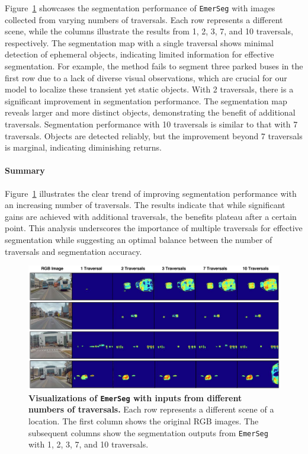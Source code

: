 Figure~\ref{fig:ablation-traversal-appendix} showcases the segmentation performance of \texttt{EmerSeg} with images collected from varying numbers of traversals. Each row represents a different scene, while the columns illustrate the results from 1, 2, 3, 7, and 10 traversals, respectively. The segmentation map with a single traversal shows minimal detection of ephemeral objects, indicating limited information for effective segmentation. For example, the method fails to segment three parked buses in the first row due to a lack of diverse visual observations, which are crucial for our model to localize these transient yet static objects. With 2 traversals, there is a significant improvement in segmentation performance. The segmentation map reveals larger and more distinct objects, demonstrating the benefit of additional traversals. Segmentation performance with 10 traversals is similar to that with 7 traversals. Objects are detected reliably, but the improvement beyond 7 traversals is marginal, indicating diminishing returns.


\paragraph{Summary} Figure~\ref{fig:ablation-traversal-appendix} illustrates the clear trend of improving segmentation performance with an increasing number of traversals. The results indicate that while significant gains are achieved with additional traversals, the benefits plateau after a certain point. This analysis underscores the importance of multiple traversals for effective segmentation while suggesting an optimal balance between the number of traversals and segmentation accuracy.


\vspace{5mm}


\begin{figure}[ht]
\begin{center}
\centerline{\includegraphics[width=\columnwidth]{figs_compressed/ablation-traversal_compressed.pdf}}
\caption{\textbf{Visualizations of \texttt{EmerSeg} with inputs from different numbers of traversals.} Each row represents a different scene of a location. The first column shows the original RGB images. The subsequent columns show the segmentation outputs from \texttt{EmerSeg} with 1, 2, 3, 7, and 10 traversals.}
\label{fig:ablation-traversal-appendix}
\end{center}
\end{figure}

